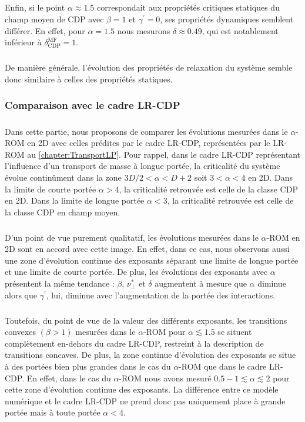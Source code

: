 \subparagraph{}Enfin, si le point $\alpha\approx 1.5$ correspondait aux propriétés critiques statiques du champ moyen de CDP avec $\beta=1$ et $\gamma^\prime=0$, ses propriétés dynamiques semblent différer. En effet, pour $\alpha = 1.5$ nous mesurons $\delta\approx 0.49$, qui est notablement inférieur à $\delta_\text{CDP}^\text{MF}=1$. 

\subparagraph{}De manière générale, l'évolution des propriétés de relaxation du système semble donc similaire à celles des propriétés statiques.

\subsubsection{Comparaison avec le cadre LR-CDP}

\subparagraph{}Dans cette partie, nous proposons de comparer les évolutions mesurées dans le $\alpha$-ROM en 2D avec celles prédites par le cadre LR-CDP, représentées par le LR-ROM au \autoref{chapter:TransportLP}. Pour rappel, dans le cadre LR-CDP représentant l'influence d'un transport de masse à longue portée, la criticalité du système évolue continûment dans la zone $3D/2 < \alpha < D+2$ soit $3 < \alpha < 4$ en 2D. Dans la limite de courte portée $\alpha > 4$, la criticalité retrouvée est celle de la classe CDP en 2D. Dans la limite de longue portée $\alpha < 3$, la criticalité retrouvée est celle de la classe CDP en champ moyen. 

\subparagraph{}D'un point de vue purement qualitatif, les évolutions mesurées dans le $\alpha$-ROM en 2D sont en accord avec cette image. En effet, dans ce cas, nous observons aussi une zone d'évolution continue des exposants séparant une limite de longue portée et une limite de courte portée. De plus, les évolutions des exposants avec $\alpha$ présentent la même tendance : $\beta$, $\nu_\perp^*$ et $\delta$ augmentent à mesure que $\alpha$ diminue alors que $\gamma^\prime$, lui, diminue avec l'augmentation de la portée des interactions.

\subparagraph{}Toutefois, du point de vue de la valeur des différents exposants, les transitions convexes $(\beta > 1)$ mesurées dans le $\alpha$-ROM pour $\alpha \lesssim 1.5$ se situent complètement en-dehors du cadre LR-CDP, restreint à la description de transitions concaves. De plus, la zone continue d'évolution des exposants se situe à des portées bien plus grandes dans le cas du $\alpha$-ROM que dans le cadre LR-CDP. En effet, dans le cas du $\alpha$-ROM nous avons mesuré $0.5-1 \lesssim \alpha \lesssim 2$ pour cette zone d'évolution continue des exposants. La différence entre ce modèle numérique et le cadre LR-CDP ne prend donc pas uniquement place à grande portée mais à toute portée $\alpha < 4$.

